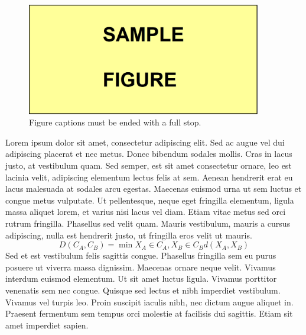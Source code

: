 \begin{figure}
 \centering
 \includegraphics[width=290pt,keepaspectratio=true]{./fig/sekil4}
 \vspace{4mm}
 \caption{Figure captions must be ended with a full stop.}
 \label{fig:3-1-4}
\end{figure}

Lorem ipsum dolor sit amet, consectetur adipiscing elit. Sed ac augue vel dui 
adipiscing placerat et nec metus. Donec bibendum sodales mollis. Cras in lacus 
justo, at vestibulum quam. Sed semper, est sit amet consectetur ornare, leo est 
lacinia velit, adipiscing elementum lectus felis at sem. Aenean hendrerit erat eu 
lacus malesuada at sodales arcu egestas. Maecenas euismod urna ut sem luctus et 
congue metus vulputate. Ut pellentesque, neque eget fringilla elementum, ligula 
massa aliquet lorem, et varius nisi lacus vel diam. Etiam vitae metus sed orci 
rutrum fringilla. Phasellus sed velit quam. Mauris vestibulum, mauris a cursus 
adipiscing, nulla est hendrerit justo, ut fringilla eros velit ut mauris.
\begin{equation}
    D\left(C_{A},C_{B}\right) = \min X_{A}\in C_{A},X_{B}\in C_{B} 
     d\left(X_{A},X_{B}\right)  
\end{equation}
Sed et est vestibulum felis sagittis congue. Phasellus fringilla sem eu purus 
posuere ut viverra massa dignissim. Maecenas ornare neque velit. Vivamus interdum 
euismod elementum. Ut sit amet luctus ligula. Vivamus porttitor venenatis sem nec 
congue. Quisque sed lectus et nibh imperdiet vestibulum. Vivamus vel turpis leo. 
Proin suscipit iaculis nibh, nec dictum augue aliquet in. Praesent fermentum sem 
tempus orci molestie at facilisis dui sagittis. Etiam sit amet imperdiet sapien.


